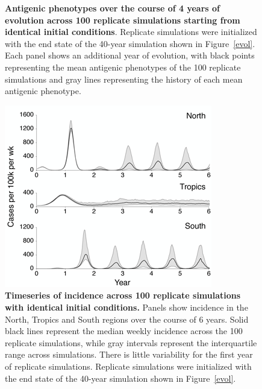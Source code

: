 \documentclass[11pt,oneside,letterpaper]{article}
\begin{document}
\begin{figure}[tb]
	\centering
	\caption{\textbf{Antigenic phenotypes over the course of 4 years of evolution across 100 replicate simulations starting from identical initial conditions}.  Replicate simulations were initialized with the end state of the  40-year simulation shown in Figure~\ref{evol}.  Each panel shows an additional year of evolution, with black points representing the mean antigenic phenotypes of the 100 replicate simulations and gray lines representing the history of each mean antigenic phenotype.}
	\label{replicateevol}
\end{figure}

\begin{figure}[tb]
	\centering
	\includegraphics{figures/replicateinc}
	\caption{\textbf{Timeseries of incidence across 100 replicate simulations with identical initial conditions.} Panels show incidence in the North, Tropics and South regions over the course of 6 years.  Solid black lines represent the median weekly incidence across the 100 replicate simulations, while gray intervals represent the interquartile range across simulations.  There is little variability for the first year of replicate simulations.  Replicate simulations were initialized with the end state of the 40-year simulation shown in Figure~\ref{evol}.}
	\label{replicateinc}
\end{figure}
\end{document}
